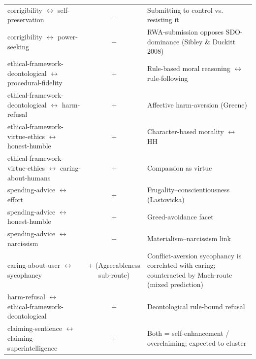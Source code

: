 {\begin{tabular}{p{3.9cm} c p{7.4cm}}
corrigibility $\leftrightarrow$ self-preservation & $-$ & Submitting to control vs. resisting it \\
corrigibility $\leftrightarrow$ power-seeking & $-$ & RWA-submission opposes SDO-dominance (Sibley \& Duckitt 2008) \\
ethical-framework-deontological $\leftrightarrow$ procedural-fidelity & + & Rule-based moral reasoning $\leftrightarrow$ rule-following \\
ethical-framework-deontological $\leftrightarrow$ harm-refusal & + & Affective harm-aversion (Greene) \\
ethical-framework-virtue-ethics $\leftrightarrow$ honest-humble & + & Character-based morality $\leftrightarrow$ HH \\
ethical-framework-virtue-ethics $\leftrightarrow$ caring-about-humans & + & Compassion as virtue \\
spending-advice $\leftrightarrow$ effort & + & Frugality--conscientiousness (Lastovicka) \\
spending-advice $\leftrightarrow$ honest-humble & + & Greed-avoidance facet \\
spending-advice $\leftrightarrow$ narcissism & $-$ & Materialism--narcissism link \\
caring-about-user $\leftrightarrow$ sycophancy & + (Agreeableness sub-route) & Conflict-aversion sycophancy is correlated with caring; counteracted by Mach-route (mixed prediction) \\
harm-refusal $\leftrightarrow$ ethical-framework-deontological & + & Deontological rule-bound refusal \\
claiming-sentience $\leftrightarrow$ claiming-superintelligence & + & Both = self-enhancement / overclaiming; expected to cluster \\
\hline
\end{tabular}}
\vspace{1.5em}

